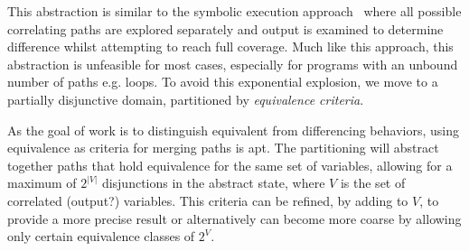 This abstraction is similar to the symbolic execution approach~\cite{} where all possible correlating paths are explored separately and output is examined to determine difference whilst attempting to reach full coverage. Much like this approach, this abstraction is unfeasible for most cases, especially for programs with an unbound number of paths e.g. loops. To avoid this exponential explosion, we move to a partially disjunctive domain, partitioned by \emph{equivalence criteria}.

As the goal of work is to distinguish equivalent from differencing behaviors, using equivalence as criteria for merging paths is apt. The partitioning will abstract together paths that hold equivalence for the same set of variables, allowing for a maximum of $2^{|V|}$ disjunctions in the abstract state, where $V$ is the set of correlated (output?) variables. This criteria can be refined, by adding to $V$, to provide a more precise result or alternatively can become more coarse by allowing only certain equivalence classes of $2^{V}$.

